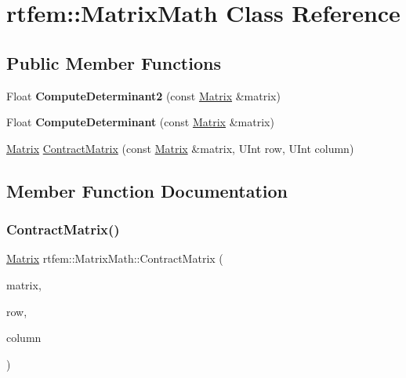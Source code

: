 \hypertarget{classrtfem_1_1MatrixMath}{}\section{rtfem\+:\+:Matrix\+Math Class Reference}
\label{classrtfem_1_1MatrixMath}
\subsection*{Public Member Functions}
\begin{DoxyCompactItemize}
\item 
\mbox{\label{classrtfem_1_1MatrixMath_ac3ca40932c7e62f59bc00b8772313857}} 
Float {\bfseries Compute\+Determinant2} (const \hyperlink{classrtfem_1_1Matrix}{Matrix} \&matrix)
\item 
\mbox{\label{classrtfem_1_1MatrixMath_ae39c4f773be6f5f9c4c1c3b63b770c33}} 
Float {\bfseries Compute\+Determinant} (const \hyperlink{classrtfem_1_1Matrix}{Matrix} \&matrix)
\item 
\hyperlink{classrtfem_1_1Matrix}{Matrix} \hyperlink{classrtfem_1_1MatrixMath_ae4dc6270835424a47c2affa8bccb4bea}{Contract\+Matrix} (const \hyperlink{classrtfem_1_1Matrix}{Matrix} \&matrix, U\+Int row, U\+Int column)
\end{DoxyCompactItemize}


\subsection{Member Function Documentation}
\mbox{\label{classrtfem_1_1MatrixMath_ae4dc6270835424a47c2affa8bccb4bea}} 
\subsubsection{\texorpdfstring{Contract\+Matrix()}{ContractMatrix()}}
{\footnotesize\ttfamily \hyperlink{classrtfem_1_1Matrix}{Matrix} rtfem\+::\+Matrix\+Math\+::\+Contract\+Matrix (\begin{DoxyParamCaption}\item[{const \hyperlink{classrtfem_1_1Matrix}{Matrix} \&}]{matrix,  }\item[{U\+Int}]{row,  }\item[{U\+Int}]{column }\end{DoxyParamCaption})}

